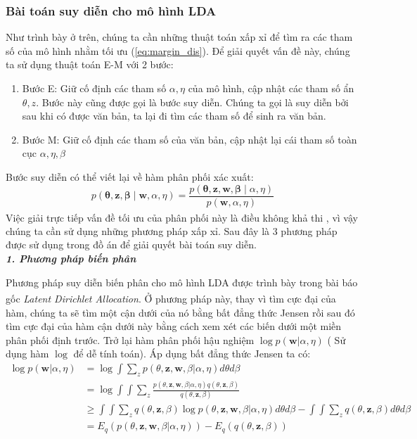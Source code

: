 \documentclass[fontsize=13pt]{scrartcl}
\begin{document}
\subsubsection{Bài toán suy diễn cho mô hình LDA}\label{sub:infermethods}
Như trình bày ở trên, chúng ta cần những thuật toán xấp xỉ để tìm ra các tham số của mô hình nhằm tối ưu (\ref{eq:margin_dis}). Để giải quyết vấn đề này, chúng ta sử dụng thuật toán E-M với 2 bước:
\begin{enumerate}
\item Bước E: Giữ cố định các tham số $\alpha,\eta$ của mô hình, cập nhật các tham số ẩn $\theta,z$. Bước này cũng được gọi là bước suy diễn. Chúng ta gọi là suy diễn bởi sau khi có được văn bản, ta lại đi tìm các tham số để sinh ra văn bản.
\item Bước M: Giữ cố định các tham số của văn bản, cập nhật lại cái tham số toàn cục $\alpha,\eta,\beta$
\end{enumerate}
Bước suy diễn có thể viết lại về hàm phân phối xác xuất:
\begin{equation}
p(\boldsymbol\theta,\mathbf{z},\boldsymbol\beta \mid \mathbf{w},\alpha,\eta) = \frac{p(\boldsymbol\theta,\mathbf{z},\mathbf{w},\boldsymbol\beta \mid \alpha,\eta)}{p(\mathbf{w},\alpha,\eta)}
\end{equation}
Việc giải trực tiếp vấn đề tối ưu của phân phối này là điều không khả thi \textsuperscript{\cite{intract}}, vì vậy chúng ta cần sử dụng những phương pháp xấp xỉ. Sau đây là 3 phương pháp được sử dụng trong đồ án để giải quyết bài toán suy diễn.\\ 
\textbf{\textit{1. Phương pháp biến phân }}
\par 
Phương pháp suy diễn biến phân cho mô hình LDA được trình bày trong bài báo gốc \textit{Latent Dirichlet Allocation}\textsuperscript{\cite{blei2003latent}}.
Ở phương pháp này, thay vì tìm cực đại của hàm, chúng ta sẽ tìm một cận dưới của nó bằng bất đẳng thức Jensen rồi sau đó tìm cực đại của hàm cận dưới này bằng cách xem xét các biến dưới một miền phân phối định trước.
Trở lại hàm phân phối hậu nghiệm $\log p(\mathbf{w}|\alpha,\eta)$ ( Sử dụng hàm $\log$ để dễ tính toán). Áp dụng bất đẳng thức Jensen ta có:
\begin{align}
\log p(\mathbf{w} | \alpha, \eta) &= \log \int \sum_{z} p(\theta,\mathbf{z},\mathbf{w},\beta | \alpha,\eta)d\theta d\beta \\
&= \log \int \int \sum_{z} \frac{p(\theta,\mathbf{z},\mathbf{w},\beta | \alpha,\eta)q(\theta,\mathbf{z},\beta)}{q(\theta,\mathbf{z},\beta)} \\
&\geq \int\int\sum_{z}q(\theta,\mathbf{z},\beta)\log p(\theta,\mathbf{z},\mathbf{w},\beta | \alpha,\eta) d\theta d\beta - \int\int\sum_{z}q(\theta,\mathbf{z},\beta) d\theta d\beta\\
&=E_q (p(\theta,\mathbf{z},\mathbf{w},\beta | \alpha,\eta)) - E_q(q(\theta,\mathbf{z},\beta)) \label{eq:varialeft}
\end{align}
\end{document}
